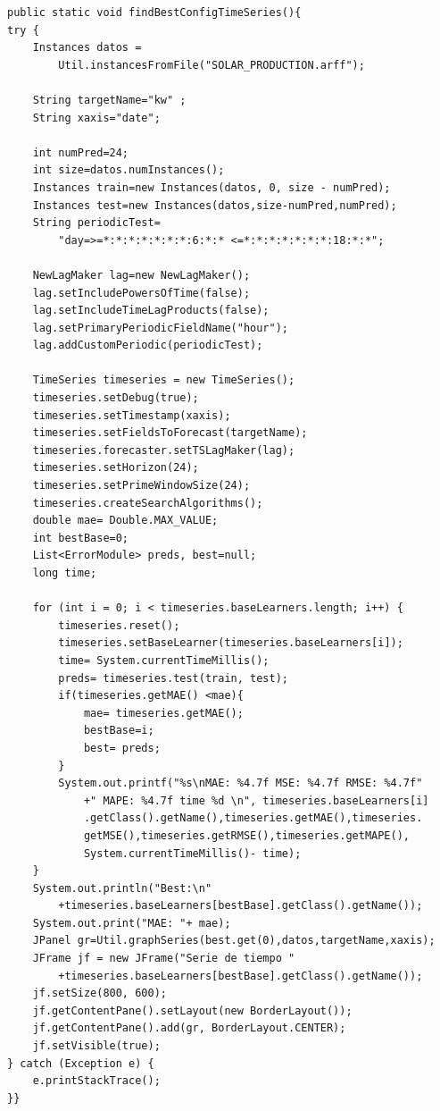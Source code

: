 \begin{lstlisting}[frame=single]  
public static void findBestConfigTimeSeries(){
try { 
	Instances datos =
		Util.instancesFromFile("SOLAR_PRODUCTION.arff");

	String targetName="kw" ;
	String xaxis="date";
	
	int numPred=24;
	int size=datos.numInstances();
	Instances train=new Instances(datos, 0, size - numPred);
	Instances test=new Instances(datos,size-numPred,numPred);
	String periodicTest=
		"day=>=*:*:*:*:*:*:*:6:*:* <=*:*:*:*:*:*:*:18:*:*";
	
	NewLagMaker lag=new NewLagMaker();
	lag.setIncludePowersOfTime(false);
	lag.setIncludeTimeLagProducts(false);
	lag.setPrimaryPeriodicFieldName("hour"); 
	lag.addCustomPeriodic(periodicTest);
	
	TimeSeries timeseries = new TimeSeries();
	timeseries.setDebug(true);
	timeseries.setTimestamp(xaxis);
	timeseries.setFieldsToForecast(targetName);
	timeseries.forecaster.setTSLagMaker(lag);
	timeseries.setHorizon(24);
	timeseries.setPrimeWindowSize(24);
	timeseries.createSearchAlgorithms();
	double mae= Double.MAX_VALUE;
	int bestBase=0;
	List<ErrorModule> preds, best=null;
	long time;

	for (int i = 0; i < timeseries.baseLearners.length; i++) {
		timeseries.reset();
		timeseries.setBaseLearner(timeseries.baseLearners[i]);
		time= System.currentTimeMillis();
		preds= timeseries.test(train, test);
		if(timeseries.getMAE() <mae){
			mae= timeseries.getMAE();
			bestBase=i;
			best= preds;
		}
		System.out.printf("%s\nMAE: %4.7f MSE: %4.7f RMSE: %4.7f"
			+" MAPE: %4.7f time %d \n", timeseries.baseLearners[i]
			.getClass().getName(),timeseries.getMAE(),timeseries.
			getMSE(),timeseries.getRMSE(),timeseries.getMAPE(),
			System.currentTimeMillis()- time);
	}
	System.out.println("Best:\n"
		+timeseries.baseLearners[bestBase].getClass().getName());
	System.out.print("MAE: "+ mae);
	JPanel gr=Util.graphSeries(best.get(0),datos,targetName,xaxis);
	JFrame jf = new JFrame("Serie de tiempo " 
		+timeseries.baseLearners[bestBase].getClass().getName());
	jf.setSize(800, 600);
	jf.getContentPane().setLayout(new BorderLayout());
	jf.getContentPane().add(gr, BorderLayout.CENTER);
	jf.setVisible(true);
} catch (Exception e) {
	e.printStackTrace();
}}
\end{lstlisting}

